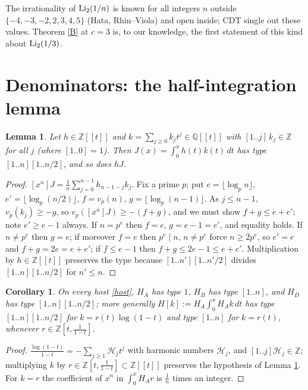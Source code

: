 \documentclass[11pt]{amsart}
\newtheorem{lemma}[theorem]{Lemma}
\newtheorem{corollary}[theorem]{Corollary}
\theoremstyle{remark}
\newcommand{\Q}{\mathbb Q}\newcommand{\Z}{\mathbb Z}\newcommand{\R}{\mathbb R}\newcommand{\C}{\mathbb C}
\newcommand{\lcm}[1]{[1..#1]}
\begin{document}
The irrationality of $\mathrm{Li}_2(1/n)$ is known for all integers $n$ outside $\{-4,-3,-2,2,3,4,5\}$ (Hata, Rhin--Viola) and open inside; CDT \cite[\S\ ``Integral holonomic modules'']{CDT} single out these values. Theorem \ref{B} at $c=3$ is, to our knowledge, the first statement of this kind about $\mathrm{Li}_2(1/3)$.

\section{Denominators: the half-integration lemma}

\begin{lemma}\label{half}
Let $h\in\Z[[t]]$ and $k=\sum_{j\ge0}k_jt^j\in\Q[[t]]$ with $\lcm j\,k_j\in\Z$ for all $j$ (where $\lcm0=1$). Then $J(x)=\int_0^xh(t)k(t)\,dt$ has type $\lcm n\lcm{n/2}$, and so does $hJ$.
\end{lemma}

\begin{proof}
$[x^n]J=\frac1n\sum_{j=0}^{n-1}h_{n-1-j}k_j$. Fix a prime $p$; put $e=\lfloor\log_pn\rfloor$, $e'=\lfloor\log_p(n/2)\rfloor$, $f=v_p(n)$, $g=\lfloor\log_p(n-1)\rfloor$. As $j\le n-1$, $v_p(k_j)\ge-g$, so $v_p([x^n]J)\ge-(f+g)$, and we must show $f+g\le e+e'$; note $e'\ge e-1$ always. If $n=p^e$ then $f=e$, $g=e-1=e'$, and equality holds. If $n\ne p^e$ then $g=e$; if moreover $f=e$ then $p^e\mid n$, $n\ne p^e$ force $n\ge2p^e$, so $e'=e$ and $f+g=2e=e+e'$; if $f\le e-1$ then $f+g\le2e-1\le e+e'$. Multiplication by $h\in\Z[[t]]$ preserves the type because $\lcm{n'}\lcm{n'/2}$ divides $\lcm n\lcm{n/2}$ for $n'\le n$.
\end{proof}

\begin{corollary}\label{types}
On every host \eqref{host}, $H_A$ has type $1$, $H_B$ has type $\lcm n$, and $H_D$ has type $\lcm n\lcm{n/2}$; more generally $H[k]:=H_A\int_0^xH_Ak\,dt$ has type $\lcm n\lcm{n/2}$ for $k=r(t)\log(1-t)$ and type $\lcm n$ for $k=r(t)$, whenever $r\in\Z[t,\frac1{1-t}]$.
\end{corollary}

\begin{proof}
$\frac{\log(1-t)}{1-t}=-\sum_{j\ge1}\mathcal H_jt^j$ with harmonic numbers $\mathcal H_j$, and $\lcm j\mathcal H_j\in\Z$; multiplying $k$ by $r\in\Z[t,\frac1{1-t}]\subset\Z[[t]]$ preserves the hypothesis of Lemma \ref{half}. For $k=r$ the coefficient of $x^n$ in $\int_0^xH_Ar$ is $\frac1n$ times an integer.
\end{proof}
\end{document}
